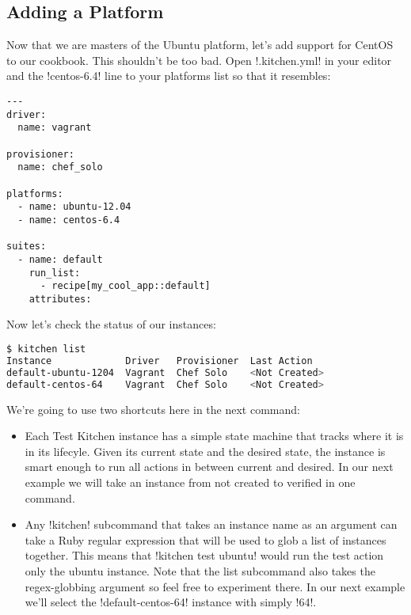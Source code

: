 \subsection{Adding a Platform}

Now that we are masters of the Ubuntu platform, let's add support for CentOS to our cookbook. This shouldn't be too bad. Open \inline!.kitchen.yml! in your editor and the \inline!centos-6.4! line to your platforms list so that it resembles:

\begin{lstlisting}[label=lst:testing-test-kitchen20]
---
driver:
  name: vagrant

provisioner:
  name: chef_solo

platforms:
  - name: ubuntu-12.04
  - name: centos-6.4

suites:
  - name: default
    run_list:
      - recipe[my_cool_app::default]
    attributes:
\end{lstlisting}

Now let's check the status of our instances:

\begin{lstlisting}[language=Bash,label=lst:testing-test-kitchen21]
$ kitchen list
Instance             Driver   Provisioner  Last Action
default-ubuntu-1204  Vagrant  Chef Solo    <Not Created>
default-centos-64    Vagrant  Chef Solo    <Not Created>
\end{lstlisting}

We're going to use two shortcuts here in the next command:

\begin{itemize}
  \item Each Test Kitchen instance has a simple state machine that tracks where it is in its lifecyle. Given its current state and the desired state, the instance is smart enough to run all actions in between current and desired. In our next example we will take an instance from not created to verified in one command.
  \item Any \inline!kitchen! subcommand that takes an instance name as an argument can take a Ruby regular expression that will be used to glob a list of instances together. This means that \inline!kitchen test ubuntu! would run the test action only the ubuntu instance. Note that the list subcommand also takes the regex-globbing argument so feel free to experiment there. In our next example we'll select the \inline!default-centos-64! instance with simply \inline!64!.
\end{itemize}

